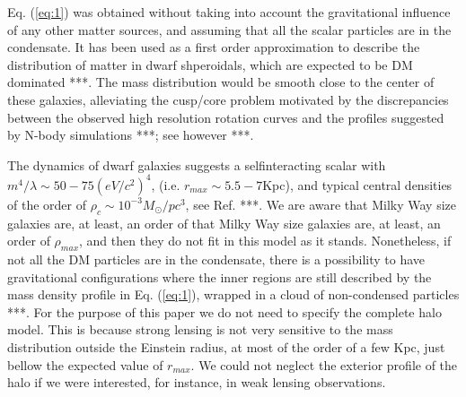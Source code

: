 \documentclass[10pt, letterpaper]{article}
\begin{document}
\begin{multicols}{2}
		Eq. (\ref{eq:1}) was obtained without taking into account the gravitational influence of any other matter sources, and assuming that all the scalar particles are in the condensate. It has been used as a first order approximation to describe the distribution of matter in dwarf shperoidals, which are expected to be DM dominated ***. The mass distribution would be smooth close to the center of these galaxies, alleviating the cusp/core problem motivated by the discrepancies between the observed high resolution rotation curves and the profiles suggested by N-body simulations ***; see however ***.\par
		The dynamics of dwarf galaxies suggests a selfinteracting scalar with $m^4/\lambda \sim 50-75(eV/c^2)^4$, (i.e. $r_{max} \sim 5.5- 7$Kpc), and typical central densities of the order of $\rho_c \sim 10^{-3}M_{\odot}/pc^3$, see Ref. ***. We are aware that Milky Way size galaxies are, at least, an order of that Milky Way size galaxies are, at least, an order of $\rho_{max}$, and then they do not fit in this model as it stands. Nonetheless, if not all the DM particles are in the condensate, there is a possibility to have gravitational configurations where the inner regions are still described by the mass density profile in Eq. (\ref{eq:1}), wrapped in a cloud of non-condensed particles ***. For the purpose of this paper we do not need to specify the complete halo model. This is because strong lensing is not very sensitive to the mass distribution outside the Einstein radius, at most of the order of a few Kpc, just bellow the expected value of $r_{max}$. We could not neglect the exterior profile of the halo if we were interested, for instance, in weak lensing observations.

\end{multicols}
\end{document}
